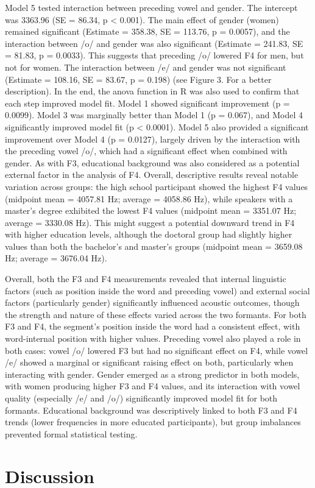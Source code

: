 \documentclass[
  man]{apa6}
\begin{document}
Model 5 tested interaction between preceding vowel and gender. The intercept was 3363.96 (SE = 86.34, p \textless{} 0.001). The main effect of gender (women) remained significant (Estimate = 358.38, SE = 113.76, p = 0.0057), and the interaction between /o/ and gender was also significant (Estimate = 241.83, SE = 81.83, p = 0.0033). This suggests that preceding /o/ lowered F4 for men, but not for women. The interaction between /e/ and gender was not significant (Estimate = 108.16, SE = 83.67, p = 0.198) (see Figure 3. For a better description).
In the end, the anova function in R was also used to confirm that each step improved model fit. Model 1 showed significant improvement (p = 0.0099). Model 3 was marginally better than Model 1 (p = 0.067), and Model 4 significantly improved model fit (p \textless{} 0.0001). Model 5 also provided a significant improvement over Model 4 (p = 0.0127), largely driven by the interaction with the preceding vowel /o/, which had a significant effect when combined with gender.
As with F3, educational background was also considered as a potential external factor in the analysis of F4. Overall, descriptive results reveal notable variation across groups: the high school participant showed the highest F4 values (midpoint mean = 4057.81 Hz; average = 4058.86 Hz), while speakers with a master's degree exhibited the lowest F4 values (midpoint mean = 3351.07 Hz; average = 3330.08 Hz). This might suggest a potential downward trend in F4 with higher education levels, although the doctoral group had slightly higher values than both the bachelor's and master's groups (midpoint mean = 3659.08 Hz; average = 3676.04 Hz).

Overall, both the F3 and F4 measurements revealed that internal linguistic factors (such as position inside the word and preceding vowel) and external social factors (particularly gender) significantly influenced acoustic outcomes, though the strength and nature of these effects varied across the two formants. For both F3 and F4, the segment's position inside the word had a consistent effect, with word-internal position with higher values. Preceding vowel also played a role in both cases: vowel /o/ lowered F3 but had no significant effect on F4, while vowel /e/ showed a marginal or significant raising effect on both, particularly when interacting with gender. Gender emerged as a strong predictor in both models, with women producing higher F3 and F4 values, and its interaction with vowel quality (especially /e/ and /o/) significantly improved model fit for both formants. Educational background was descriptively linked to both F3 and F4 trends (lower frequencies in more educated participants), but group imbalances prevented formal statistical testing.

\section{Discussion}\label{discussion}
\end{document}
